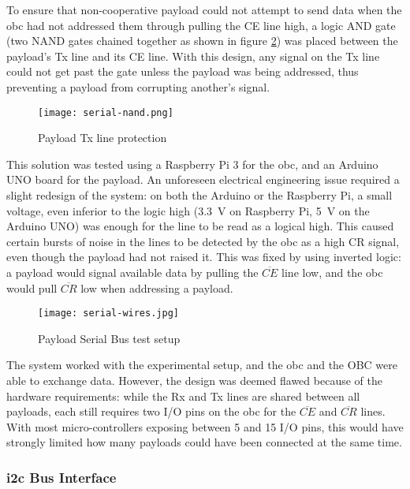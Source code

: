 To ensure that non-cooperative payload could not attempt to send data when the
\acrshort{obc} had not addressed them through pulling the CE line high, a logic
AND gate (two NAND gates chained together as shown in figure \ref{fig:uart-nor})
was placed between the payload's Tx line and its CE line. With this design,
any signal on the Tx line could not get past the gate unless the payload was
being addressed, thus preventing a payload from corrupting another's signal.

\begin{figure}[H]
\texttt{[image: serial-nand.png]}
\centering
\caption{Payload Tx line protection}
\label{fig:uart-nor}
\end{figure}

This solution was tested using a Raspberry Pi 3 for the \acrlong{obc}, and an
Arduino UNO board for the payload. An unforeseen electrical engineering issue
required a slight redesign of the system: on both the Arduino or the Raspberry
Pi, a small voltage, even inferior to the logic high (\SI{3.3}{V} on Raspberry
Pi, \SI{5}{V} on the Arduino UNO) was enough for the line to be read as a
logical high. This caused certain bursts of noise in the lines to be detected
by the \acrshort{obc} as a high CR signal, even though the payload had not
raised it. This was fixed by using inverted logic: a payload would signal 
available data by pulling the \(\overline{CE}\) line low, and the \acrshort{obc}
would pull \(\overline{CR}\) low when addressing a payload.

\begin{figure}[H]
\texttt{[image: serial-wires.jpg]}
\centering
\caption{Payload Serial Bus test setup}
\label{fig:uart-nor}
\end{figure}

The system worked with the experimental setup, and the \acrlong{obc} and the
OBC were able to exchange data. However, the design was deemed flawed because
of the hardware requirements: while the Rx and Tx lines are shared between all
payloads, each still requires two I/O pins on the \acrshort{obc} for the 
\(\overline{CE}\) and \(\overline{CR}\) lines. With most micro-controllers
exposing between 5 and 15 I/O pins, this would have strongly limited how many
payloads could have been connected at the same time.

\subsubsection{\acrshort{i2c} Bus Interface}

